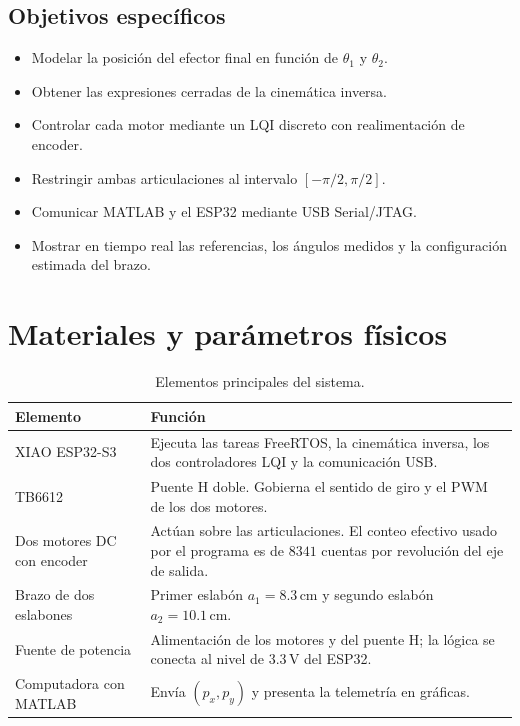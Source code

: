 \documentclass[11pt,a4paper]{article}
\begin{document}
\subsection{Objetivos específicos}

\begin{itemize}
    \item Modelar la posición del efector final en función de $\theta_1$ y $\theta_2$.
    \item Obtener las expresiones cerradas de la cinemática inversa.
    \item Controlar cada motor mediante un LQI discreto con realimentación de encoder.
    \item Restringir ambas articulaciones al intervalo $[-\pi/2,\pi/2]$.
    \item Comunicar MATLAB y el ESP32 mediante USB Serial/JTAG.
    \item Mostrar en tiempo real las referencias, los ángulos medidos y la configuración estimada del brazo.
\end{itemize}

\section{Materiales y parámetros físicos}

\begin{table}[H]
\centering
\caption{Elementos principales del sistema.}
\begin{tabular}{>{\raggedright\arraybackslash}p{4.2cm} p{9.2cm}}
\toprule
\textbf{Elemento} & \textbf{Función} \\
\midrule
XIAO ESP32-S3 & Ejecuta las tareas FreeRTOS, la cinemática inversa, los dos controladores LQI y la comunicación USB. \\
TB6612 & Puente H doble. Gobierna el sentido de giro y el PWM de los dos motores. \\
Dos motores DC con encoder & Actúan sobre las articulaciones. El conteo efectivo usado por el programa es de $8341$ cuentas por revolución del eje de salida. \\
Brazo de dos eslabones & Primer eslabón $a_1=8.3\,\mathrm{cm}$ y segundo eslabón $a_2=10.1\,\mathrm{cm}$. \\
Fuente de potencia & Alimentación de los motores y del puente H; la lógica se conecta al nivel de $3.3\,\mathrm{V}$ del ESP32. \\
Computadora con MATLAB & Envía $(p_x,p_y)$ y presenta la telemetría en gráficas. \\
\bottomrule
\end{tabular}
\end{table}
\end{document}
